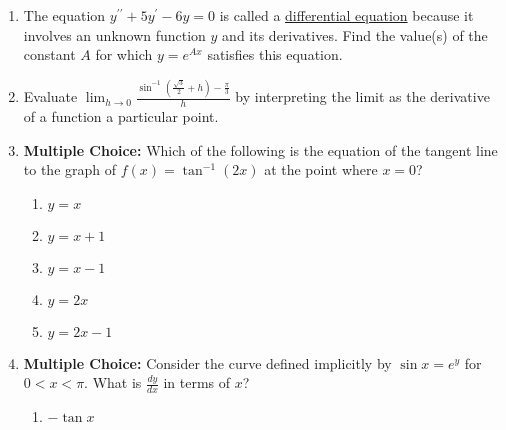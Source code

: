 \documentclass[12pt]{article}
\newif\ifans
\begin{document}
\begin{enumerate}
\item The equation $y^{\prime \prime}+5y^{\prime}-6y=0$ is called a \underline{differential equation} because it involves an unknown function $y$ and its derivatives.  Find the value(s) of the constant $A$ for which $y=e^{Ax}$ satisfies this equation. 

\ifans{\fbox{$A=-6$ and $A=1$}} \fi

\item Evaluate $\lim_{h \rightarrow 0}{\frac{\sin^{-1}{\left(\frac{\sqrt{3}}{2}+h\right)}-\frac{\pi}{3}}{h}}$ by interpreting the limit as the derivative of a function a particular point.

\ifans{\fbox{$\lim_{h \rightarrow 0}{\frac{\sin^{-1}{\left(\frac{\sqrt{3}}{2}+h\right)}-\frac{\pi}{3}}{h}}=\left.\frac{d}{dx}(\sin^{-1}{(x)}\right|_{x=\frac{\sqrt{3}}{2}}=\left.\frac{1}{\sqrt{1-x^2}}\right|_{x=\frac{\sqrt{3}}{2}}=2$}} \fi

\item {\bf Multiple Choice:} Which of the following is the equation of the tangent line to the graph of $f(x)=\tan^{-1}(2x)$ at the point where $x=0$?

\begin{enumerate}

\item $y=x$\\

\item $y=x+1$\\

\item $y=x-1$\\

\item $y=2x$\\

\item $y=2x-1$\\

\end{enumerate}

\ifans{\fbox{D}} \fi

\newpage

\item {\bf Multiple Choice:} Consider the curve defined implicitly by $\sin{x}=e^y$ for $0<x<\pi$. What is $\frac{dy}{dx}$ in terms of $x$?

\begin{enumerate}

\item $-\tan{x}$\\


\end{enumerate}
\end{enumerate}
\end{document}
